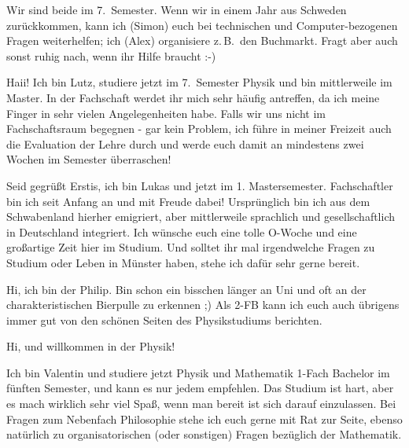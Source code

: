 \begin{multicols*}{2}
{Wir sind beide im 7.\ Semester. Wenn wir in einem Jahr aus Schweden zurückkommen, kann ich (Simon) euch bei technischen und Computer-bezogenen Fragen weiterhelfen; ich (Alex) organisiere z.\,B.\ den Buchmarkt. Fragt aber auch sonst ruhig nach, wenn ihr Hilfe braucht :-)}

{Haii! Ich bin Lutz, studiere jetzt im 7.\ Semester Physik und bin mittlerweile im Master. In der Fachschaft werdet ihr mich sehr häufig antreffen, da ich meine Finger in sehr vielen Angelegenheiten habe. Falls wir uns nicht im Fachschaftsraum begegnen - gar kein Problem, ich führe in meiner Freizeit auch die Evaluation der Lehre durch und werde euch damit an mindestens zwei Wochen im Semester überraschen!}

{Seid gegrüßt Erstis, ich bin Lukas und jetzt im 1. Mastersemester. Fachschaftler bin ich seit Anfang an und mit Freude dabei! Ursprünglich bin ich aus dem Schwabenland hierher emigriert, aber mittlerweile sprachlich und gesellschaftlich in Deutschland integriert. Ich wünsche euch eine tolle O-Woche und eine großartige Zeit hier im Studium. Und solltet ihr mal irgendwelche Fragen zu Studium oder Leben in Münster haben, stehe ich dafür sehr gerne bereit.}

{Hi, ich bin der Philip. Bin schon ein bisschen länger an Uni und oft an der charakteristischen Bierpulle zu erkennen ;) Als 2-FB kann ich euch auch übrigens immer gut von den schönen Seiten des Physikstudiums berichten.}

{Hi, und willkommen in der Physik!

Ich bin Valentin und studiere jetzt Physik und Mathematik 1-Fach Bachelor im fünften Semester, und kann es nur jedem empfehlen. Das Studium ist hart, aber es mach wirklich sehr viel Spaß, wenn man bereit ist sich darauf einzulassen. Bei Fragen zum Nebenfach Philosophie stehe ich euch gerne mit Rat zur Seite, ebenso natürlich zu organisatorischen (oder sonstigen) Fragen bezüglich der Mathematik.

}
\end{multicols*}
